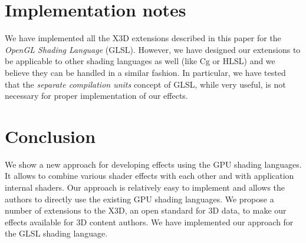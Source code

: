 \documentclass{egpubl}
\begin{document}
\section{Implementation notes}

We have implemented all the X3D extensions described in this paper
for the \emph{OpenGL Shading Language} (GLSL).
However, we have designed our extensions
to be applicable to other shading languages as well (like Cg or HLSL)
and we believe they can be handled in a similar fashion.
In particular, we have tested that the \emph{separate compilation units}
concept of GLSL, while very useful, is not necessary for proper implementation
of our effects.




\section{Conclusion}

We show a new approach for developing effects using the GPU shading languages.
It allows to combine various shader effects with each other
and with application internal shaders.
Our approach is relatively easy
to implement and allows the authors to directly use the existing GPU shading
languages.
We propose a number of extensions to the X3D,
an open standard for 3D data, to make our effects available for 3D
content authors. We have implemented our approach for the GLSL shading language.





\end{document}
